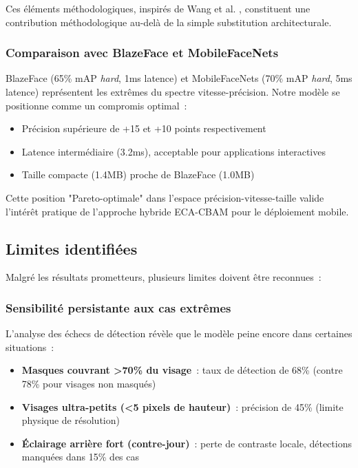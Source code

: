 \begin{onehalfspace}
\hspace{0.65 cm}Ces éléments méthodologiques, inspirés de Wang et al. \cite{Wang2024ECACBAM}, constituent une contribution méthodologique au-delà de la simple substitution architecturale.

\subsubsection{Comparaison avec BlazeFace et MobileFaceNets}

\hspace{0.65 cm}BlazeFace \cite{Zhang2019BlazeFace} (65\% mAP \textit{hard}, 1ms latence) et MobileFaceNets \cite{Chen2018MobileFaceNets} (70\% mAP \textit{hard}, 5ms latence) représentent les extrêmes du spectre vitesse-précision. Notre modèle se positionne comme un compromis optimal~:
\begin{itemize}
\item Précision supérieure de +15 et +10 points respectivement
\item Latence intermédiaire (3.2ms), acceptable pour applications interactives
\item Taille compacte (1.4MB) proche de BlazeFace (1.0MB)
\end{itemize}

\hspace{0.65 cm}Cette position "Pareto-optimale" dans l'espace précision-vitesse-taille valide l'intérêt pratique de l'approche hybride ECA-CBAM pour le déploiement mobile.

\subsection{Limites identifiées}

\hspace{0.65 cm}Malgré les résultats prometteurs, plusieurs limites doivent être reconnues~:

\subsubsection{Sensibilité persistante aux cas extrêmes}

\hspace{0.65 cm}L'analyse des échecs de détection révèle que le modèle peine encore dans certaines situations~:
\begin{itemize}
\item \textbf{Masques couvrant >70\% du visage}~: taux de détection de 68\% (contre 78\% pour visages non masqués)
\item \textbf{Visages ultra-petits (<5 pixels de hauteur)}~: précision de 45\% (limite physique de résolution)
\item \textbf{Éclairage arrière fort (contre-jour)}~: perte de contraste locale, détections manquées dans 15\% des cas
\end{itemize}


\end{onehalfspace}
